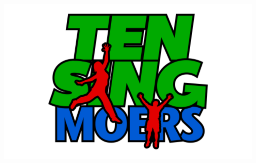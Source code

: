 \begin{minipage}{\textwidth}
\begin{center}
\includegraphics[scale=.3,trim=100mm 0mm 100mm 0mm]{res/TEN_SING_Logo}
\end{center}
\end{minipage}

\pagebreak

